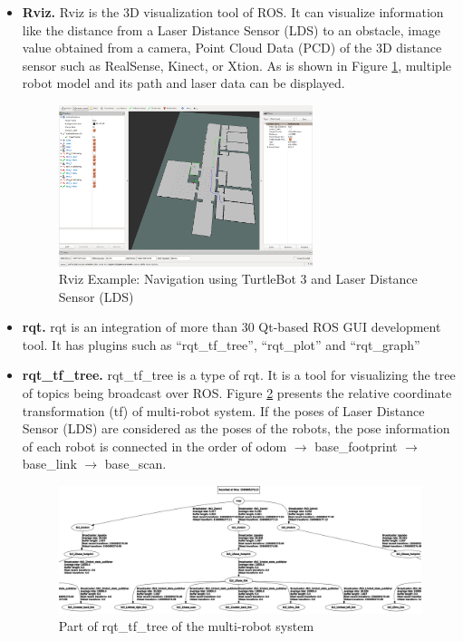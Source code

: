 \begin{itemize}
    \item \textbf{Rviz.} Rviz\cite{RVIZ} is the 3D visualization tool of ROS. It can visualize information like the distance from a Laser Distance Sensor (LDS) to an obstacle, image value obtained from a camera, Point Cloud Data (PCD) of the 3D distance sensor such as RealSense, Kinect, or Xtion. As is shown in Figure \ref{fig:Rviz_gui}, multiple robot model and its path and laser data can be displayed.
    \begin{figure}[htbp]
        \centering
        \includegraphics[width = 0.7\textwidth]{content/images/ch2/Rviz_gui.png}
        \caption{Rviz Example: Navigation using TurtleBot 3 and Laser Distance Sensor (LDS)}
        \label{fig:Rviz_gui}
    \end{figure}

    \item \textbf{rqt.} rqt is an integration of more than 30 Qt-based ROS GUI development tool. It has plugins such as ``rqt\_tf\_tree'', ``rqt\_plot'' and  ``rqt\_graph''
   
    \item \textbf{rqt\_tf\_tree.} rqt\_tf\_tree is a type of rqt. It is a tool for visualizing the tree of topics being broadcast over ROS. Figure \ref{fig:tf_tree} presents the relative coordinate transformation (tf) of multi-robot system. If the poses of Laser Distance Sensor (LDS) are considered as the poses of the robots, the pose information of each robot is connected in the order of odom $\rightarrow$ base\_footprint $\rightarrow$ base\_link $\rightarrow$ base\_scan.
    
    \begin{figure}[htbp]
        \centering
        \includegraphics[width = 0.\textwidth]{content/images/ch2/rqt_tree.png}
        \caption{Part of rqt\_tf\_tree of the multi-robot system}
        \label{fig:tf_tree}
        \end{figure}
       

\end{itemize}
